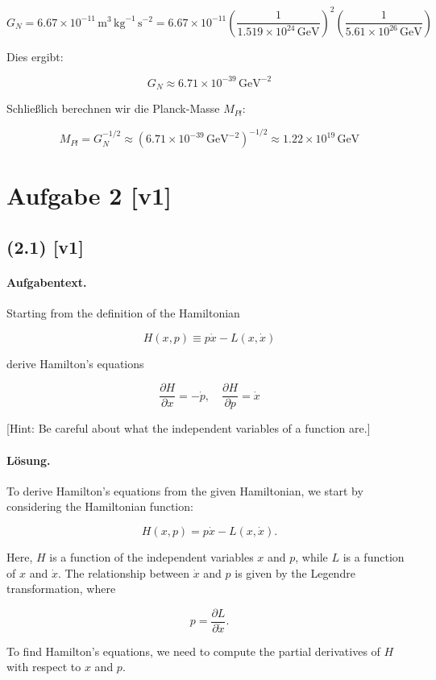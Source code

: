 \documentclass[11pt,a4paper]{article}
\begin{document}
\[
G_N = 6.67 \times 10^{-11} \, \mathrm{m}^3 \, \mathrm{kg}^{-1} \, \mathrm{s}^{-2} = 6.67 \times 10^{-11} \left( \frac{1}{1.519 \times 10^{24} \, \text{GeV}} \right)^2 \left( \frac{1}{5.61 \times 10^{26} \, \text{GeV}} \right)
\]

Dies ergibt:

\[
G_N \approx 6.71 \times 10^{-39} \, \text{GeV}^{-2}
\]

Schließlich berechnen wir die Planck-Masse $M_{Pl}$:

\[
M_{Pl} = G_N^{-1/2} \approx (6.71 \times 10^{-39} \, \text{GeV}^{-2})^{-1/2} \approx 1.22 \times 10^{19} \, \text{GeV}
\]

\section*{Aufgabe 2 [v1]}
\subsection*{(2.1) [v1]}
\paragraph{Aufgabentext.}
Starting from the definition of the Hamiltonian

$$
H(x, p) \equiv p \dot{x}-L(x, \dot{x})
$$

derive Hamilton's equations

$$
\frac{\partial H}{\partial x}=-\dot{p}, \quad \frac{\partial H}{\partial p}=\dot{x}
$$

[Hint: Be careful about what the independent variables of a function are.]

\paragraph{Lösung.}
To derive Hamilton's equations from the given Hamiltonian, we start by considering the Hamiltonian function:

$$
H(x, p) = p \dot{x} - L(x, \dot{x}).
$$

Here, \( H \) is a function of the independent variables \( x \) and \( p \), while \( L \) is a function of \( x \) and \( \dot{x} \). The relationship between \( \dot{x} \) and \( p \) is given by the Legendre transformation, where

$$
p = \frac{\partial L}{\partial \dot{x}}.
$$

To find Hamilton's equations, we need to compute the partial derivatives of \( H \) with respect to \( x \) and \( p \).
\end{document}
